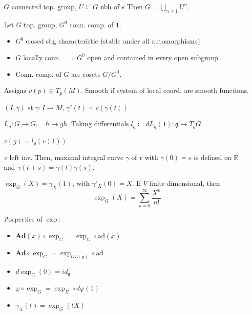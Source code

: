 \begin{proposition} $G$ connected top. group, $U \subseteq G$ nbh of $e$ Then $G = \bigcup_{n \geq 1} U^n$.
\end{proposition}

\begin{proposition} Let $G$ top. group, $G^0$ conn. comp. of $1$. 
\begin{itemize}[topsep=-6pt, itemsep=0pt]
    \item $G^0$ closed sbg characteristic (stable under all automorphisms)
    \item $G$ locally conn. $ \implies G^0$ open and contained in every open subgroup
    \item Conn. comp. of $G$ are cosets $G / G^0$.
\end{itemize}
\end{proposition}

\begin{definition} Assigns $v(p) \in T_p(M)$. Smooth if system of local coord. are smooth functions.
\end{definition}

\begin{definition} $(I, \gamma)$ st $\gamma : I \to M$, $\gamma '(t) = c(\gamma (t))$
\end{definition}

\begin{definition} $L_g : G \to  G, \quad h \mapsto gh$. Taking differentials $l_g \coloneqq dL_g(1) : \mathfrak{g} \to T_gG$ 
\end{definition}

\begin{definition} $v(g) = l_g(v(1))$ 
\end{definition}

\begin{proposition} $v$ left inv. Then, maximal integral curve $\gamma$ of $v$ with $\gamma (0) = e$ is defined on $\mathbb{R}$ and $\gamma (t + s) = \gamma (t) \gamma (s)$.
\end{proposition}

\begin{definition} $\exp _G (X) = \gamma _X(1)$, with $\gamma '_X(0) = X$. If $V$ finite dimensional, then
\[
\exp _G (X) = \sum_{n=0}^\infty \frac{X^n}{n!}
\]
\end{definition}

\begin{proposition} Porperties of $\exp$:
\begin{itemize}[topsep=-6pt, itemsep=0pt]
    \item $\mathrm{\textbf{Ad}}(x) \circ \exp_G = \exp_G \circ \mathrm{ad}(x)$
    \item $\mathrm{\textbf{Ad}} \circ \exp_G = \exp_{GL(\mathfrak{g})} \circ \mathrm{ad}$ 
    \item $d \exp _G(0) = id_\mathfrak{g}$ 
    \item $\varphi \circ \exp_G = \exp_H \circ d\varphi (1)$
    \item $\gamma _X (t) = \exp_G(tX)$
\end{itemize}
\end{proposition}

